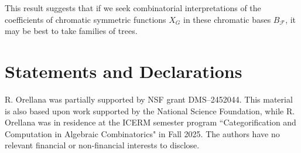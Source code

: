 \documentclass[12pt]{amsart}  %
\theoremstyle{definition}
\theoremstyle{remark}
\numberwithin{equation}{section}
\begin{document}
This result suggests that if we seek combinatorial interpretations of the coefficients of chromatic symmetric functions $X_G$ in these chromatic bases $B_{\mathcal F}$, it may be best to take families of trees. 


\section{Statements and Declarations}
R. Orellana was partially supported by NSF grant DMS--2452044. This material is also based upon work
supported by the National Science Foundation, while R. Orellana was in residence
at the ICERM semester program ``Categorification and Computation in Algebraic Combinatorics" in Fall
2025. The authors have no relevant financial or non-financial interests to disclose.

%
\end{document}
